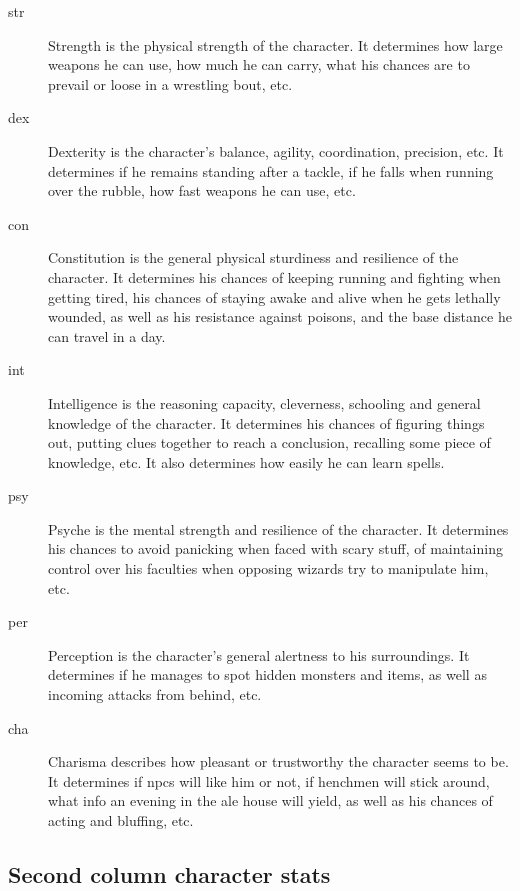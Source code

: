 \begin{description}

\item[str] Strength is the physical strength of the character. It determines how large weapons he can use, how much he can carry, what his chances are to prevail or loose in a wrestling bout, etc.

\item[dex] Dexterity is the character's balance, agility, coordination, precision, etc. It determines if he remains standing after a tackle, if he falls when running over the rubble, how fast weapons he can use, etc.

\item[con] Constitution is the general physical sturdiness and resilience of the character. It determines his chances of keeping running and fighting when getting tired, his chances of staying awake and alive when he gets lethally wounded, as well as his resistance against poisons, and the base distance he can travel in a day.

\item[int] Intelligence is the reasoning capacity, cleverness, schooling and general knowledge of the character. It determines his chances of figuring things out, putting clues together to reach a conclusion, recalling some piece of knowledge, etc. It also determines how easily he can learn spells.

\item[psy] Psyche is the mental strength and resilience of the character. It determines his chances to avoid panicking when faced with scary stuff, of maintaining control over his faculties when opposing wizards try to manipulate him, etc.

\item[per] Perception is the character's general alertness to his surroundings. It determines if he manages to spot hidden monsters and items, as well as incoming attacks from behind, etc.

\item[cha] Charisma describes how pleasant or trustworthy the character seems to be. It determines if npcs will like him or not, if henchmen will stick around, what info an evening in the ale house will yield, as well as his chances of acting and bluffing, etc.

\end{description}


\subsection*{Second column character stats}

